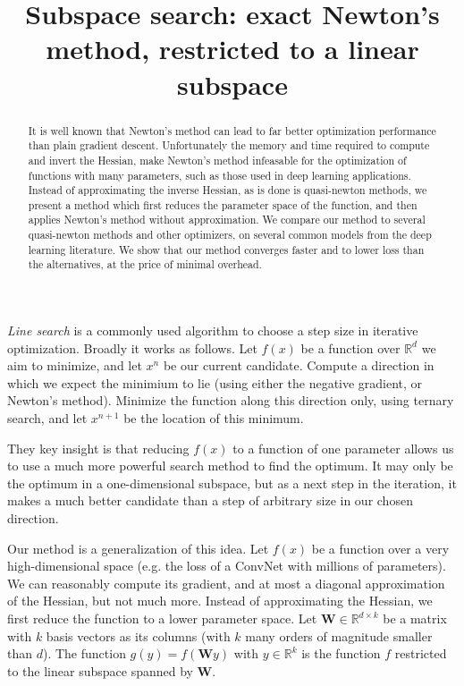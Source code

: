 \documentclass[11pt]{article}
\title{Subspace search: exact Newton's method, restricted to a linear subspace}
\newcommand{\R}{{\mathbb R}}
\newcommand{\W}{{\boldsymbol W}}
\begin{document}
\maketitle

\begin{abstract}
\noindent It is well known that Newton's method can lead to far better optimization performance than plain gradient descent. Unfortunately the memory and time required to compute and invert the Hessian, make Newton's method infeasable for the optimization of functions with many parameters, such as those used in deep learning applications. Instead of approximating the inverse Hessian, as is done is quasi-newton methods, we present a method which first reduces the parameter space of the function, and then applies Newton's method without approximation. We compare our method to several quasi-newton methods and other optimizers, on several common models from the deep learning literature. We show that our method converges faster and to lower loss than the alternatives, at the price of minimal overhead.
\end{abstract}

\emph{Line search} is a commonly used algorithm to choose a step size in iterative optimization. Broadly it works as follows. Let $f(x)$ be a function over $\R^d$ we aim to minimize, and let $x^n$ be our current candidate. Compute a direction in which we expect the minimium to lie (using either the negative gradient, or Newton's method). Minimize the function along this direction only, using ternary search, and let $x^{n+1}$ be the location of this minimum.

They key insight is that reducing $f(x)$ to a function of one parameter allows us to use a much more powerful search method to find the optimum. It may only be the optimum in a one-dimensional subspace, but as a next step in the iteration, it makes a much better candidate than a step of arbitrary size in our chosen direction.

 Our method is a generalization of this idea. Let $f(x)$ be a function over a very high-dimensional space (e.g. the loss of a ConvNet with millions of parameters). We can reasonably compute its gradient, and at most a diagonal approximation of the Hessian, but not much more. Instead of approximating the Hessian, we first reduce the function to a lower parameter space. Let $\W \in \R^{d\times k}$ be a matrix with $k$ basis vectors as its columns (with $k$ many orders of magnitude smaller than $d$). The function $g(y) = f(\W y)$  with $y \in \R^k$ is the function $f$ restricted to the linear subspace spanned by $\W$.
\end{document}
